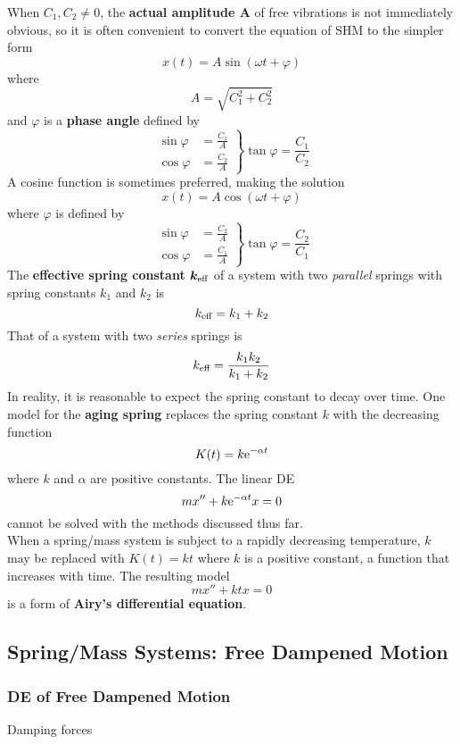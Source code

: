 \documentclass[./Differential Equations.tex]{subfiles}
\begin{document}
				When \(C_1, C_2 \ne 0\), the \textbf{actual amplitude \(\bm{A}\)} of free vibrations is not immediately obvious, so it is often convenient to convert the equation of SHM to the simpler form
					\[x(t) = A\sin(\omega t + \varphi)\]
					where
					\[A = \sqrt{C_1^2 + C_2^2}\]
					and \(\varphi\) is a \textbf{phase angle} defined by
					\[
						\left.\begin{aligned}
							\sin\varphi &= \frac{C_1}{A} \\
							\cos\varphi &= \frac{C_2}{A}
						\end{aligned}\right\}
						\tan\varphi = \frac{C_1}{C_2}
					\]
				A cosine function is sometimes preferred, making the solution
					\[x(t) = A\cos(\omega t + \varphi)\]
					where \(\varphi\) is defined by
					\[
						\left.\begin{aligned}
							\sin\varphi &= \frac{C_2}{A} \\
							\cos\varphi &= \frac{C_1}{A}
						\end{aligned}\right\}
						\tan\varphi = \frac{C_2}{C_1}
					\]
				The \textbf{effective spring constant \(\bm{k_{\text{eff}}}\)} of a system with two \textit{parallel} springs with spring constants \(k_1\) and \(k_2\) is 
					\[k_{\text{eff}} = k_1 + k_2\]
				That of a system with two \textit{series} springs is
					\[k_{\text{eff}} = \frac{k_1k_2}{k_1 + k_2}\]
				In reality, it is reasonable to expect the spring constant to decay over time. One model for the \textbf{aging spring} replaces the spring constant \(k\) with the decreasing function
					\[K(t) = k\text{e}^{-\alpha t}\]
					where \(k\) and \(\alpha\) are positive constants. The linear DE
					\[mx'' + k\text{e}^{-\alpha t}x = 0\]
					cannot be solved with the methods discussed thus far. \\
				When a spring/mass system is subject to a rapidly decreasing temperature, \(k\) may be replaced with \(K(t) = kt\) where \(k\) is a positive constant, a function that increases with time. The resulting model
				\[mx'' + ktx = 0\]
				is a form of \textbf{Airy's differential equation}.
		\subsection{Spring/Mass Systems: Free Dampened Motion}
			\subsubsection{DE of Free Dampened Motion}
				Damping forces
\end{document}
